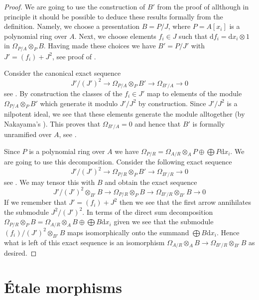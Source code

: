 \begin{proof}
We are going to use the construction of $B'$ from the proof of
allthough in principle it should be possible to deduce these results
formally from the definition. Namely, we choose a presentation
$B = P/J$, where $P = A[x_i]$ is a polynomial ring over $A$.
Next, we choose elements $f_i \in J$ such that
$\text{d}f_i = \text{d}x_i \otimes 1$ in $\Omega_{P/A} \otimes_P B$.
Having made these choices we have
$B' = P/J'$ with $J' = (f_i) + J^2$, see proof of
.

\medskip\noindent
Consider the canonical exact sequence
$$
J'/(J')^2 \to \Omega_{P/A} \otimes_P B' \to \Omega_{B'/A} \to 0
$$
see
.
By construction the classes of the $f_i \in J'$ map to elements of
the module $\Omega_{P/A} \otimes_P B'$ which generate it modulo
$J'/J^2$ by construction. Since $J'/J^2$ is a nilpotent ideal, we see
that these elements generate the module alltogether (by
Nakayama's ). This proves that $\Omega_{B'/A} = 0$
and hence that $B'$ is formally unramified over $A$, see
.

\medskip\noindent
Since $P$ is a polynomial ring over $A$ we have
$\Omega_{P/R} = \Omega_{A/R} \otimes_A P \oplus \bigoplus P\text{d}x_i$.
We are going to use this decomposition.
Consider the following exact sequence
$$
J'/(J')^2 \to
\Omega_{P/R} \otimes_P B' \to
\Omega_{B'/R} \to 0
$$
see
.
We may tensor this with $B$ and obtain the exact sequence
$$
J'/(J')^2 \otimes_{B'} B \to
\Omega_{P/R} \otimes_P B \to
\Omega_{B'/R} \otimes_{B'} B \to 0
$$
If we remember that $J' = (f_i) + J^2$
then we see that the first arrow annihilates the submodule $J^2/(J')^2$.
In terms of the direct sum decomposition
$\Omega_{P/R} \otimes_P B =
\Omega_{A/R} \otimes_A B \oplus \bigoplus B\text{d}x_i $ given
we see that the submodule $(f_i)/(J')^2 \otimes_{B'} B$ maps
isomorphically onto the summand $\bigoplus B\text{d}x_i$. Hence what is
left of this exact sequence is an isomorphism
$\Omega_{A/R} \otimes_A B \to \Omega_{B'/R} \otimes_{B'} B$
as desired.
\end{proof}









\section{\'Etale morphisms}
\label{section-formally-etale}

